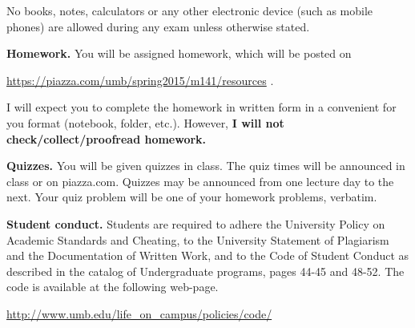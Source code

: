 \documentclass{article}
\begin{document}
No books, notes, calculators or any other electronic device (such as mobile phones) are allowed during any exam unless otherwise stated.

\medskip
\noindent \textbf{Homework.} You will be assigned homework, which will be posted on

\url{https://piazza.com/umb/spring2015/m141/resources} \quad \quad \quad .

\noindent I will expect you to complete the homework in written form in a convenient for you format (notebook, folder, etc.). However, \textbf{I will not check/collect/proofread homework.} 
 
\medskip
\noindent \textbf{Quizzes.} You will be given quizzes in class. The quiz times will be announced in class or on piazza.com. Quizzes may be announced from one lecture day to the next. Your quiz problem will be one of your homework problems, verbatim. 

\medskip
\noindent \textbf{Student conduct.} Students  are required to adhere the University Policy on Academic Standards and Cheating, to the University Statement of Plagiarism and the Documentation of Written Work, and to the Code of Student Conduct as described in the catalog of Undergraduate programs, pages 44-45 and 48-52. The code is available at the following web-page.

\noindent\url{http://www.umb.edu/life_on_campus/policies/code/}
\end{document}
